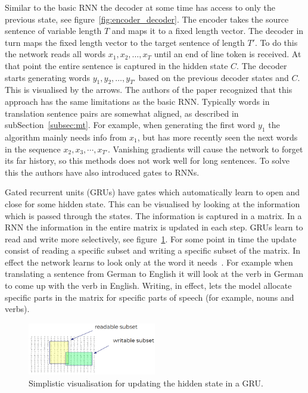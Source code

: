 Similar to the basic RNN the decoder at some time has access to only the previous state, see figure~\ref{fig:encoder_decoder}.
The encoder takes the source sentence of variable length $T$ and maps it to a fixed length vector.
The decoder in turn maps the fixed length vector to the target sentence of length $T'$.
To do this the network reads all words $x_1, x_2, \ldots, x_T$ until an end of line token is received.
At that point the entire sentence is captured in the hidden state $C$.
The decoder starts generating words $y_1, y_2, \ldots, y_{T'}$ based on the previous decoder states and $C$.
This is visualised by the arrows.
The authors of the paper recognized that this approach has the same limitations as the basic RNN.
Typically words in translation sentence pairs are somewhat aligned, as described in subSection~\ref{subsec:mt}.
For example, when generating the first word $y_1$ the algorithm mainly needs info from $x_1$, but has more recently seen the next words in the sequence $x_2, x_3, \cdots, x_{T'}$.
Vanishing gradients will cause the network to forget its far history, so this methods does not work well for long sentences.
To solve this the authors have also introduced gates to RNNs.

Gated recurrent units (GRUs) have gates which automatically learn to open and close for some hidden state.
This can be visualised by looking at the information which is passed through the states.
The information is captured in a matrix.
In a RNN the information in the entire matrix is updated in each step.
GRUs learn to read and write more selectively, see figure~\ref{fig:gru_subset}.
For some point in time the update consist of reading a specific subset and writing a specific subset of the matrix.
In effect the network learns to look only at the word it needs~\citep{manning2017lectures}.
For example when translating a sentence from German to English it will look at the verb in German to come up with the verb in English.
Writing, in effect, lets the model allocate specific parts in the matrix for specific parts of speech (for example, nouns and verbs).

\begin{figure}[htbp]
    \begin{center}
        \includegraphics[width=0.5\textwidth]{figures/gru_subset.png}
    \end{center}
    \caption{Simplistic visualisation for updating the hidden state in a GRU.}
    \label{fig:gru_subset}
\end{figure}

